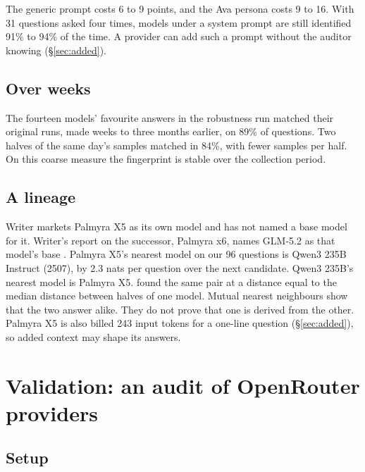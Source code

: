 \documentclass[11pt]{article}
\begin{document}
The generic prompt costs 6 to 9 points, and the Ava persona costs 9 to 16. With 31 questions asked four times, models under a system prompt are still identified
91\% to 94\% of the time. A provider can add such a prompt without the auditor knowing
(\S\ref{sec:added}).

\subsection{Over weeks}
\label{sec:weeks}

The fourteen models' favourite answers in the robustness run matched their original runs, made
weeks to three months earlier, on 89\% of questions. Two halves of the same day's samples matched
in 84\%, with fewer samples per half. On this coarse measure the fingerprint is stable over the
collection period.

\subsection{A lineage}
\label{sec:lineage}

Writer markets Palmyra X5 as its own model and has not named a base model for it. Writer's report
on the successor, Palmyra x6, names GLM-5.2 as that model's base \citep{du2026palmyrax6}. Palmyra
X5's nearest model on our 96 questions is Qwen3 235B Instruct (2507), by 2.3 nats per question over
the next candidate. Qwen3 235B's nearest model is Palmyra X5. \citet{bruckner2026onetoken} found the
same pair at a distance equal to the median distance between halves of one model. Mutual nearest
neighbours show that the two answer alike. They do not prove that one is derived from the other.
Palmyra X5 is also billed 243 input tokens for a one-line question (\S\ref{sec:added}), so added
context may shape its answers.

\section{Validation: an audit of OpenRouter providers}
\label{sec:audit}

\subsection{Setup}
\end{document}
